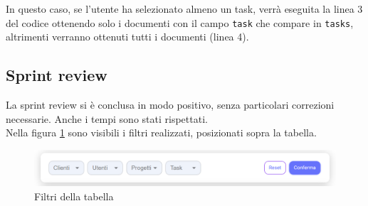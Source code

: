 \\\\

\noindent In questo caso, se l'utente ha selezionato almeno un task, verrà eseguita la linea 3 del codice ottenendo solo i documenti con il campo \texttt{task} che compare in \texttt{tasks}, altrimenti verranno ottenuti tutti i documenti (linea 4).

\subsection{Sprint review}
La sprint review si è conclusa in modo positivo, senza particolari correzioni necessarie.
Anche i tempi sono stati rispettati.\\
Nella figura \ref{fig:report_filters} sono visibili i filtri realizzati, posizionati sopra la tabella.

\begin{figure}[H]
	\includegraphics[width = \textwidth]{immagini/reports filters.png}
	\caption{Filtri della tabella}
	\label{fig:report_filters}
\end{figure}